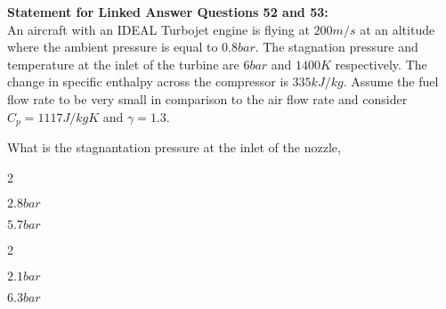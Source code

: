 	\textbf{Statement for Linked Answer Questions 52 and 53:}\\
	An aircraft with an IDEAL Turbojet engine is flying at $200 m/s$ at an altitude where the ambient pressure is equal to $0.8 bar$. The stagnation pressure and temperature at the inlet of the turbine are $6 bar$ and $1400 K$ respectively. The change in specific enthalpy across the compressor is $335 kJ/kg$. Assume the fuel flow rate to be very small in comparison to the air flow rate and consider $C_p = 1117 J/kgK$ and $\gamma = 1.3$.
\item What is the stagnantation pressure at the inlet of the nozzle,
	\begin{enumerate}
	\end{enumerate}


